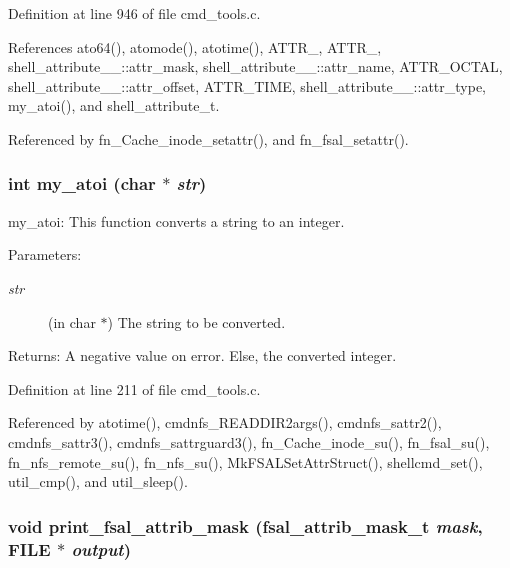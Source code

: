 Definition at line 946 of file cmd\_\-tools.c.

References ato64(), atomode(), atotime(), ATTR\_, ATTR\_, shell\_\-attribute\_\-\_\-::attr\_\-mask, shell\_\-attribute\_\-\_\-::attr\_\-name, ATTR\_\-OCTAL, shell\_\-attribute\_\-\_\-::attr\_\-offset, ATTR\_\-TIME, shell\_\-attribute\_\-\_\-::attr\_\-type, my\_\-atoi(), and shell\_\-attribute\_\-t.

Referenced by fn\_\-Cache\_\-inode\_\-setattr(), and fn\_\-fsal\_\-setattr().
\subsubsection{\setlength{\rightskip}{0pt plus 5cm}int my\_\-atoi (char $\ast$ {\em str})}\label{cmd__tools_8h_a10}


my\_\-atoi: This function converts a string to an integer.

\begin{Desc}
\item[Parameters:]
\begin{description}
\item[{\em str}](in char $\ast$) The string to be converted.\end{description}
\end{Desc}
\begin{Desc}
\item[Returns:]A negative value on error. Else, the converted integer. \end{Desc}


Definition at line 211 of file cmd\_\-tools.c.

Referenced by atotime(), cmdnfs\_\-READDIR2args(), cmdnfs\_\-sattr2(), cmdnfs\_\-sattr3(), cmdnfs\_\-sattrguard3(), fn\_\-Cache\_\-inode\_\-su(), fn\_\-fsal\_\-su(), fn\_\-nfs\_\-remote\_\-su(), fn\_\-nfs\_\-su(), Mk\-FSALSet\-Attr\-Struct(), shellcmd\_\-set(), util\_\-cmp(), and util\_\-sleep().
\subsubsection{\setlength{\rightskip}{0pt plus 5cm}void print\_\-fsal\_\-attrib\_\-mask (fsal\_\-attrib\_\-mask\_\-t {\em mask}, FILE $\ast$ {\em output})}\label{cmd__tools_8h_a19}


